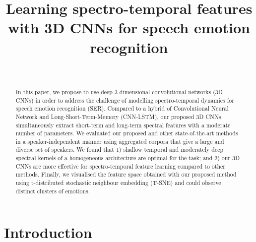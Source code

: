 \documentclass[conference, compsoc, twoside]{IEEEtran}
\begin{document}
\title{Learning spectro-temporal features \\with 3D CNNs for speech emotion recognition}

\author{\\

}

\maketitle
\thispagestyle{fancy}
\begin{abstract}
In this paper, we propose to use deep 3-dimensional convolutional networks (3D CNNs) in order to address the challenge of modelling spectro-temporal dynamics for speech emotion recognition (SER). Compared to a hybrid of Convolutional Neural Network and Long-Short-Term-Memory (CNN-LSTM), our proposed 3D CNNs simultaneously extract short-term and long-term spectral features with a moderate number of parameters. We evaluated our proposed and other state-of-the-art methods in a speaker-independent manner using aggregated corpora that give a large and diverse set of speakers. We found that 1) shallow temporal and moderately deep spectral kernels of a homogeneous architecture are optimal for the task; and 2) our 3D CNNs are more effective for spectro-temporal feature learning compared to other methods. Finally, we visualised the feature space obtained with our proposed method using t-distributed stochastic neighbour embedding (T-SNE) and could observe distinct clusters of emotions.
\end{abstract}





\IEEEpeerreviewmaketitle



\section{Introduction}
\end{document}
